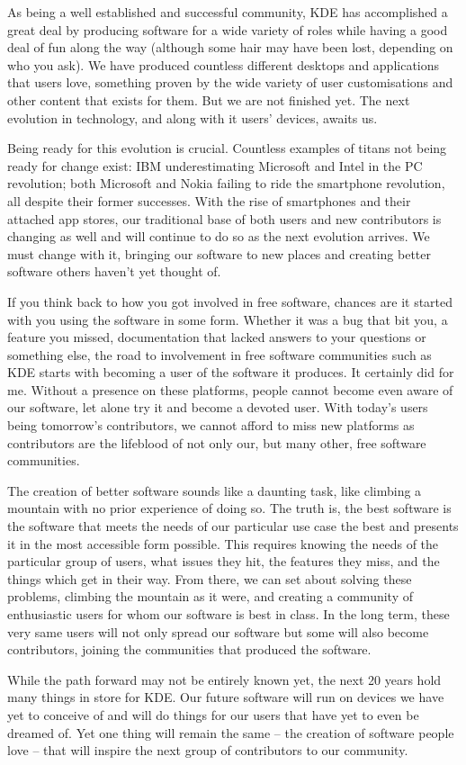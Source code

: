 

\noindent{}As being a well established and successful community, KDE has accomplished a great deal by producing software for a wide variety of roles while having a good deal of fun along the way (although some hair may have been lost, depending on who you ask). We have produced countless different desktops and applications that users love, something proven by the wide variety of user customisations and other content that exists for them. But we are not finished yet. The next evolution in technology, and along with it users' devices, awaits us.

Being ready for this evolution is crucial. Countless examples of titans not being ready for change exist: IBM underestimating Microsoft and Intel in the PC revolution; both Microsoft and Nokia failing to ride the smartphone revolution, all despite their former successes. With the rise of smartphones and their attached app stores, our traditional base of both users and new contributors is changing as well and will continue to do so as the next evolution arrives. We must change with it, bringing our software to new places and creating better software others haven't yet thought of.

If you think back to how you got involved in free software, chances are it started with you using the software in some form. Whether it was a bug that bit you, a feature you missed, documentation that lacked answers to your questions or something else, the road to involvement in free software communities such as KDE starts with becoming a user of the software it produces. It certainly did for me. Without a presence on these platforms, people cannot become even aware of our software, let alone try it and become a devoted user. With today's users being tomorrow's contributors, we cannot afford to miss new platforms  as contributors are the lifeblood of not only our, but many other, free software communities.

The creation of better software sounds like a daunting task, like climbing a mountain with no prior experience of doing so. The truth is, the best software is the software that meets the needs of our particular use case the best and presents it in the most accessible form possible. This requires knowing the needs of the particular group of users, what issues they hit, the features they miss, and the things which get in their way. From there, we can set about solving these problems, climbing the mountain as it were, and creating a community of enthusiastic users for whom our software is best in class. In the long term, these very same users will not only spread our software but some will also become contributors, joining the communities that produced the software.

While the path forward may not be entirely known yet, the next 20 years hold many things in store for KDE. Our future software will run on devices we have yet to conceive of and will do things for our users that have yet to even be dreamed of. Yet one thing will remain the same – the creation of software people love – that will inspire the next group of contributors to our community.
